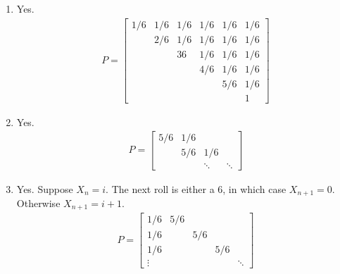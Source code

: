 \begin{solution}[Solution]
\begin{enumerate}[label=(\alph*)]
	\item Yes.
        \begin{align*}
            P = 
            \left[\begin{array}{cccccc}
                1/6 & 1/6 & 1/6 & 1/6 & 1/6 & 1/6 \\
                & 2/6 & 1/6 & 1/6 & 1/6 & 1/6 \\
                && 36 & 1/6 & 1/6 & 1/6 \\
                &&& 4/6 & 1/6 & 1/6 \\
                &&&& 5/6 & 1/6 \\
                &&&& & 1
            \end{array}\right]
        \end{align*}
        
	\item Yes.
        \begin{align*}
            P=
            \left[\begin{array}{cccc}
                5/6 & 1/6 \\
                & 5/6 & 1/6 \\
                && \ddots & \ddots
            \end{array}\right]
        \end{align*}
        
    \item Yes. Suppose \( X_n = i \). The next roll is either a 6, in which case \( X_{n+1} = 0 \). Otherwise \( X_{n+1} = i+1 \).  
        \begin{align*}
            P = \left[\begin{array}{ccccc}
            1/6 & 5/6 \\
            1/6 & & 5/6 \\
            1/6 &  & & 5/6 \\
            \vdots & & & & \ddots
            \end{array}\right]
        \end{align*}
        

\end{enumerate}
\end{solution}
